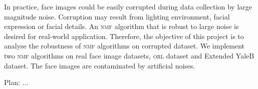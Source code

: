 In practice, face images could be easily corrupted during data collection by large magnitude noise. Corruption may result from lighting environment, facial expression or facial details. An \textsc{nmf} algorithm that is robust to large noise is desired for real-world application. Therefore, the objective of this project is to analyse the robustness of \textsc{nmf} algorithms on corrupted dataset. We implement two \textsc{nmf} algorithms on real face image datasets, \textsc{orl} dataset and Extended YaleB dataset. The face images are contaminated by artificial noises.

Plan:
...



